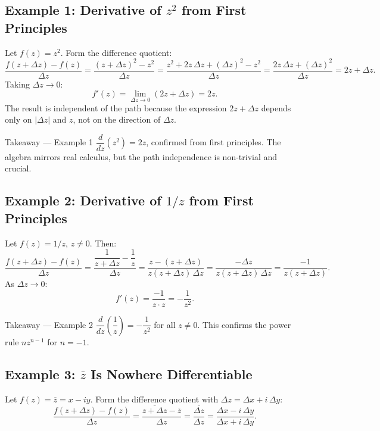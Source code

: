 \documentclass[12pt,a4paper]{article}
\begin{document}
\subsection*{Example 1: Derivative of $z^2$ from First Principles}

Let $f(z) = z^2$. Form the difference quotient:
\[
  \frac{f(z+\Delta z)-f(z)}{\Delta z}
  = \frac{(z+\Delta z)^2 - z^2}{\Delta z}
  = \frac{z^2 + 2z\,\Delta z + (\Delta z)^2 - z^2}{\Delta z}
  = \frac{2z\,\Delta z + (\Delta z)^2}{\Delta z}
  = 2z + \Delta z.
\]
Taking $\Delta z \to 0$:
\[
  f'(z) = \lim_{\Delta z\to 0}(2z + \Delta z) = 2z.
\]
The result is independent of the path because the expression $2z + \Delta z$ depends
only on $|\Delta z|$ and $z$, not on the direction of $\Delta z$.

\begin{learnbox}{Takeaway --- Example 1}
$\dfrac{d}{dz}(z^2) = 2z$, confirmed from first principles. The algebra mirrors
real calculus, but the path independence is non-trivial and crucial.
\end{learnbox}

\subsection*{Example 2: Derivative of $1/z$ from First Principles}

Let $f(z) = 1/z$, $z \neq 0$. Then:
\[
  \frac{f(z+\Delta z)-f(z)}{\Delta z}
  = \frac{\dfrac{1}{z+\Delta z} - \dfrac{1}{z}}{\Delta z}
  = \frac{z - (z+\Delta z)}{z(z+\Delta z)\,\Delta z}
  = \frac{-\Delta z}{z(z+\Delta z)\,\Delta z}
  = \frac{-1}{z(z+\Delta z)}.
\]
As $\Delta z \to 0$:
\[
  f'(z) = \frac{-1}{z \cdot z} = -\frac{1}{z^2}.
\]

\begin{learnbox}{Takeaway --- Example 2}
$\dfrac{d}{dz}\!\left(\dfrac{1}{z}\right) = -\dfrac{1}{z^2}$ for all $z \neq 0$.
This confirms the power rule $nz^{n-1}$ for $n=-1$.
\end{learnbox}

\subsection*{Example 3: $\overline{z}$ Is Nowhere Differentiable}

Let $f(z) = \overline{z} = x - iy$. Form the difference quotient with
$\Delta z = \Delta x + i\,\Delta y$:
\[
  \frac{f(z+\Delta z)-f(z)}{\Delta z}
  = \frac{\overline{z+\Delta z} - \overline{z}}{\Delta z}
  = \frac{\overline{\Delta z}}{\Delta z}
  = \frac{\Delta x - i\,\Delta y}{\Delta x + i\,\Delta y}.
\]
\end{document}
